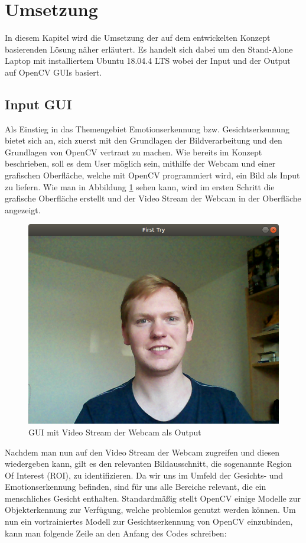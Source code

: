 \documentclass[12pt, a4paper]{report}
\begin{document}
\section{Umsetzung}
In diesem Kapitel wird die Umsetzung der auf dem entwickelten Konzept basierenden Lösung näher erläutert. Es handelt sich dabei um den Stand-Alone Laptop mit installiertem Ubuntu 18.04.4 LTS wobei der Input und der Output auf OpenCV GUIs basiert.

\subsection{Input GUI}
Als Einstieg in das Themengebiet Emotionserkennung bzw. Gesichtserkennung bietet sich an, sich zuerst mit den Grundlagen der Bildverarbeitung und den Grundlagen von OpenCV vertraut zu machen. Wie bereits im Konzept beschrieben, soll es dem User möglich sein, mithilfe der Webcam und einer grafischen Oberfläche, welche mit OpenCV programmiert wird, ein Bild als Input zu liefern. Wie man in Abbildung \ref{fig:Input GUI 1} sehen kann, wird im ersten Schritt die grafische Oberfläche erstellt und der Video Stream der Webcam in der Oberfläche angezeigt.

\begin{figure}[h]
\includegraphics[width=\linewidth]{Bilder/InputGUI1.png}
\caption{GUI mit Video Stream der Webcam als Output}
\label{fig:Input GUI 1}
\end{figure}
Nachdem man nun auf den Video Stream der Webcam zugreifen und diesen wiedergeben kann, gilt es den relevanten Bildausschnitt, die sogenannte Region Of Interest (ROI), zu identifizieren. Da wir uns im Umfeld der Gesichts- und Emotionserkennung befinden, sind für uns alle Bereiche relevant, die ein menschliches Gesicht enthalten. Standardmäßig stellt OpenCV einige Modelle zur Objekterkennung zur Verfügung, welche problemlos genutzt werden können. Um nun ein vortrainiertes Modell zur Gesichtserkennung von OpenCV einzubinden, kann man folgende Zeile an den Anfang des Codes schreiben:\newline
\end{document}
